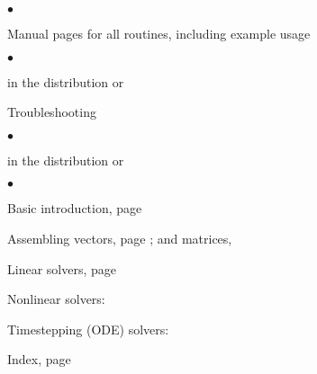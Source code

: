

\medskip\medskip


\medskip

\begin{list}{$\bullet$}
{
\setlength{\itemsep}{-.020in} 
\setlength{\topsep}{0in} 
\setlength{\partopsep}{0in}
}
\item Manual pages for all routines, including example usage
\begin{list}{$\bullet$}
{
\setlength{\itemsep}{-.020in} 
\setlength{\topsep}{0in} 
\setlength{\partopsep}{0in}
}
   \item {} in the distribution or 
   \item {}
\end{list}
\item Troubleshooting
\begin{list}{$\bullet$}
{
\setlength{\itemsep}{-.020in} 
\setlength{\topsep}{0in} 
\setlength{\partopsep}{0in}
}
   \item {} in the distribution or
   \item {}
\end{list}
\end{list}

\medskip
{}
\begin{list}{$\bullet$}
{
\setlength{\itemsep}{-.02in} 
\setlength{\topsep}{.02in} 
\setlength{\partopsep}{0in}
}
\item Basic introduction, page \pageref{sec:gettingstarted}
\item Assembling vectors, page \pageref{sec:vecbasic}; and matrices, \pageref{chapter:matrices}
\item Linear solvers, page \pageref{ch:sles}
\item Nonlinear solvers: \pageref{chapter:snes}
\item Timestepping (ODE) solvers: \pageref{chapter:ts}
\item Index, page \pageref{sec:index}
\end{list}

